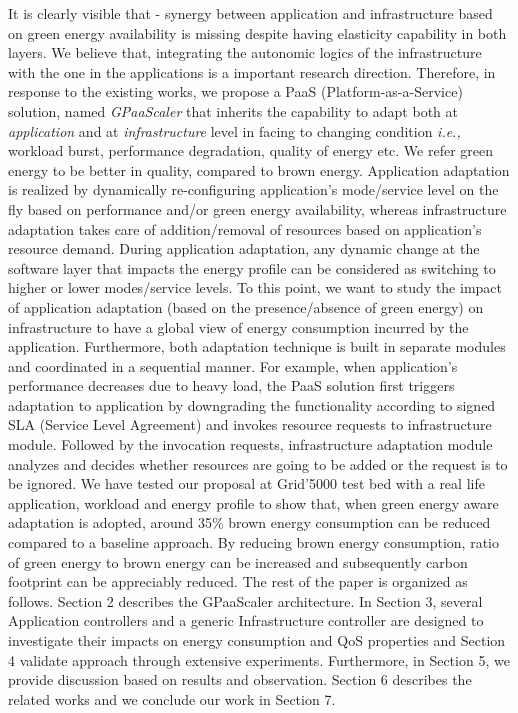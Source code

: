 It is clearly visible that - synergy between application and infrastructure based on green energy availability is missing despite having elasticity capability in both layers. We believe that, integrating the autonomic logics of the infrastructure with the one in the applications is a important research direction.
Therefore, in response to the existing works, we propose a PaaS (Platform-as-a-Service) solution, named \emph{GPaaScaler} that inherits the capability to adapt both at \emph{application} and at \emph{infrastructure} level in facing to changing condition \emph{i.e.,} workload burst, performance degradation, quality of energy etc. We refer green energy to be better in quality, compared to brown energy.
Application adaptation is realized by dynamically re-configuring application's mode/service level on the fly based on performance and/or green energy availability, whereas infrastructure adaptation takes care of addition/removal of resources based on application's resource demand. During application adaptation, any dynamic change at the software layer that impacts the energy profile can be considered as switching to higher or lower modes/service levels.
To this point, we want to study the impact of application adaptation (based on the presence/absence of green energy) on infrastructure to have a global view of energy consumption incurred by the application.
Furthermore, both adaptation technique is built in separate modules and coordinated in a sequential manner. For example, when application's performance decreases due to heavy load, the PaaS solution first triggers adaptation to application by downgrading the functionality according to signed SLA (Service Level Agreement) and invokes resource requests to infrastructure module. Followed by the invocation requests, infrastructure adaptation module analyzes and decides whether resources are going to be added or the request is to be ignored. We have tested our proposal at Grid'5000 test bed with a real life application, workload and energy profile to show that, when green energy aware adaptation is adopted, around 35\% brown energy consumption can be reduced compared to a baseline approach. By reducing brown energy consumption, ratio of green energy to brown energy can be increased and subsequently carbon footprint can be appreciably reduced.
The rest of the paper is organized as follows. Section 2 describes the GPaaScaler architecture. In Section 3, several Application controllers and a generic Infrastructure controller are designed to investigate their impacts on energy consumption and QoS properties and Section 4 validate approach through extensive experiments. Furthermore, in Section 5, we provide discussion based on results and observation. Section 6 describes the related works and we conclude our work in Section 7.